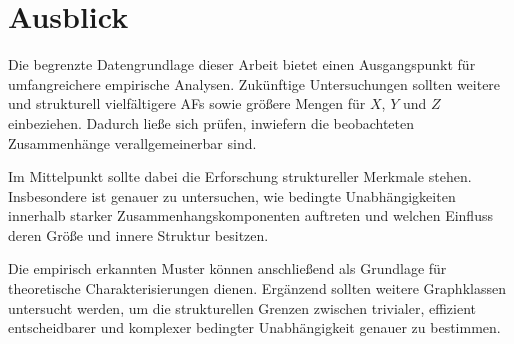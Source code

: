 \section{Ausblick}

Die begrenzte Datengrundlage dieser Arbeit bietet einen Ausgangspunkt
für umfangreichere empirische Analysen. Zukünftige Untersuchungen sollten
weitere und strukturell vielfältigere AFs sowie größere Mengen für \(X\), \(Y\)
und \(Z\) einbeziehen. Dadurch ließe sich prüfen, inwiefern die
beobachteten Zusammenhänge verallgemeinerbar sind.

Im Mittelpunkt sollte dabei die Erforschung struktureller Merkmale
stehen. Insbesondere ist genauer zu untersuchen, wie bedingte
Unabhängigkeiten innerhalb starker Zusammenhangskomponenten 
auftreten und welchen Einfluss deren Größe und innere Struktur 
besitzen.

Die empirisch erkannten Muster können anschließend als Grundlage für
theoretische Charakterisierungen dienen. Ergänzend sollten weitere
Graphklassen untersucht werden, um die strukturellen Grenzen zwischen
trivialer, effizient entscheidbarer und komplexer bedingter
Unabhängigkeit genauer zu bestimmen.
